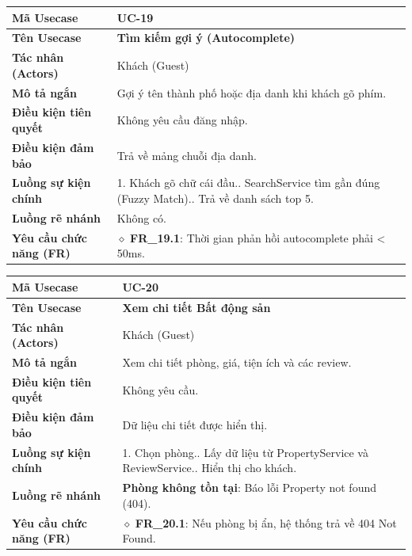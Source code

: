 \begin{table}[H]
\renewcommand{\arraystretch}{1.3}
\centering
\begin{tabularx}{\textwidth}{|p{4.5cm}|X|}
\hline
\cellcolor{gray!15}\bfseries Mã Usecase & \textbf{UC-19} \\ \hline
\cellcolor{gray!15}\bfseries Tên Usecase & \textbf{Tìm kiếm gợi ý (Autocomplete)} \\ \hline
\cellcolor{gray!15}\bfseries Tác nhân (Actors) & Khách (Guest) \\ \hline
\cellcolor{gray!15}\bfseries Mô tả ngắn & Gợi ý tên thành phố hoặc địa danh khi khách gõ phím. \\ \hline
\cellcolor{gray!15}\bfseries Điều kiện tiên quyết & Không yêu cầu đăng nhập. \\ \hline
\cellcolor{gray!15}\bfseries Điều kiện đảm bảo & Trả về mảng chuỗi địa danh. \\ \hline
\cellcolor{gray!15}\bfseries Luồng sự kiện chính & 1. Khách gõ chữ cái đầu.\newline 2. SearchService tìm gần đúng (Fuzzy Match).\newline 3. Trả về danh sách top 5. \\ \hline
\cellcolor{gray!15}\bfseries Luồng rẽ nhánh & Không có. \\ \hline
\cellcolor{gray!15}\bfseries Yêu cầu chức năng (FR) & $\diamond$ \textbf{FR\_19.1}: Thời gian phản hồi autocomplete phải < 50ms. \\ \hline
\end{tabularx}
\end{table}

\begin{table}[H]
\renewcommand{\arraystretch}{1.3}
\centering
\begin{tabularx}{\textwidth}{|p{4.5cm}|X|}
\hline
\cellcolor{gray!15}\bfseries Mã Usecase & \textbf{UC-20} \\ \hline
\cellcolor{gray!15}\bfseries Tên Usecase & \textbf{Xem chi tiết Bất động sản} \\ \hline
\cellcolor{gray!15}\bfseries Tác nhân (Actors) & Khách (Guest) \\ \hline
\cellcolor{gray!15}\bfseries Mô tả ngắn & Xem chi tiết phòng, giá, tiện ích và các review. \\ \hline
\cellcolor{gray!15}\bfseries Điều kiện tiên quyết & Không yêu cầu. \\ \hline
\cellcolor{gray!15}\bfseries Điều kiện đảm bảo & Dữ liệu chi tiết được hiển thị. \\ \hline
\cellcolor{gray!15}\bfseries Luồng sự kiện chính & 1. Chọn phòng.\newline 2. Lấy dữ liệu từ PropertyService và ReviewService.\newline 3. Hiển thị cho khách. \\ \hline
\cellcolor{gray!15}\bfseries Luồng rẽ nhánh & \textbf{Phòng không tồn tại}: Báo lỗi Property not found (404). \\ \hline
\cellcolor{gray!15}\bfseries Yêu cầu chức năng (FR) & $\diamond$ \textbf{FR\_20.1}: Nếu phòng bị ẩn, hệ thống trả về 404 Not Found. \\ \hline
\end{tabularx}
\end{table}

